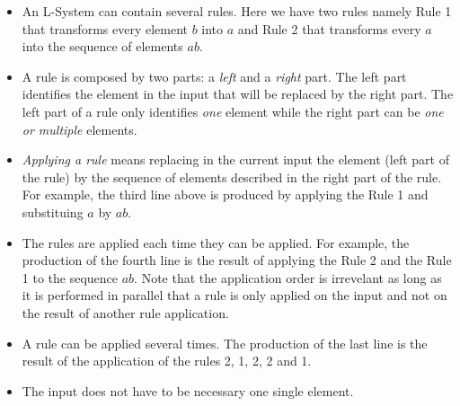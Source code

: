 \begin{itemize}
\item An L-System can contain several rules. Here we have two rules namely
Rule 1 that transforms every element $b$ into $a$ and Rule 2 that
transforms every $a$ into the sequence of elements $a b$. 

\item A rule is composed by two parts: a \emph{left} and a \emph{right} 
part.  The left part identifies the element in the input that will be
replaced by the right part. The left part
of a rule only identifies \emph{one} element while the right part can
be \emph{one or multiple} elements.
  
\item \emph{Applying a rule} means replacing in the current
input the element (left part of the rule) by the sequence of elements
described in the right part of the rule. For example, the third line
above is produced by applying the Rule 1 and substituing $a$ by $a b$.

\item The rules are applied each time they can be applied.   For example, the production of the fourth line is the result of
applying the Rule 2 and the Rule 1 to the sequence $a b$.  Note that
the application order is irrevelant as long as it is performed in
parallel \ie that a rule is only applied on the input and not on the result of another rule application.

\item A rule can be applied several times.  The production of the last line is the result of the application of the rules 2, 1, 2, 2 and 1.

\item The input does not have to be necessary one single element. 

\end{itemize}








